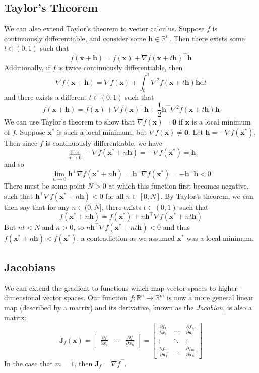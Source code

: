 \documentclass{article}
\begin{document}
\subsection{Taylor's Theorem}
We can also extend Taylor's theorem to vector calculus. Suppose $f$ is continuously differentiable, and consider some $\mathbf{h} \in \mathbb{R}^n$. Then there exists some $t \in (0, 1)$ such that $$f(\mathbf{x + h}) = f(\mathbf{x}) + \nabla f(\mathbf{x} + t\mathbf{h})^\top\mathbf{h}$$ Additionally, if $f$ is twice continuously differentiable, then $$\nabla f(\mathbf{x + h}) = \nabla f(\mathbf{x}) + \int_0^1 \nabla^2 f(\mathbf{x} + t\mathbf{h})\mathbf{h} \text{d}t$$ and there exists a different $t \in (0, 1)$ such that $$f(\mathbf{x + h}) = f(\mathbf{x}) + \nabla f(\mathbf{x})^\top\mathbf{h} + \frac{1}{2}\mathbf{h}^\top\nabla^2 f(\mathbf{x} + t\mathbf{h})\mathbf{h}$$
We can use Taylor's theorem to show that $\nabla f(\mathbf{x}) = \mathbf{0}$ if $\mathbf{x}$ is a local minimum of $f$. Suppose $\mathbf{x^*}$ is such a local minimum, but $\nabla f(\mathbf{x}) \neq \mathbf{0}$. Let $\mathbf{h} = -\nabla f(\mathbf{x^*})$. Then since $f$ is continuously differentiable, we have $$\lim_{n \rightarrow 0} -\nabla f(\mathbf{x^*} + n\mathbf{h}) = -\nabla f(\mathbf{x^*}) = \mathbf{h}$$ and so $$\lim_{n \rightarrow 0}\mathbf{h}^\top \nabla f(\mathbf{x^*} + n\mathbf{h}) = \mathbf{h}^\top\nabla f(\mathbf{x^*}) = -\mathbf{h^\top h} < 0$$ There must be some point $N > 0$ at which this function first becomes negative, such that $\mathbf{h}^\top \nabla f(\mathbf{x^*} + n\mathbf{h}) < 0$ for all $n \in [0, N]$. By Taylor's theorem, we can then say that for any $n \in (0, N]$, there exists $t \in (0, 1)$ such that $$f(\mathbf{x^*} + n\mathbf{h}) = f(\mathbf{x^*}) + n\mathbf{h}^\top\nabla f(\mathbf{x^*} + nt\mathbf{h})$$ But $nt < N$ and $n > 0$, so $n\mathbf{h}^\top\nabla f(\mathbf{x^*} + nt\mathbf{h}) < 0$ and thus $f(\mathbf{x^*} + n\mathbf{h}) < f(\mathbf{x^*})$, a contradiction as we assumed $\mathbf{x^*}$ was a local minimum.

\subsection{Jacobians}
We can extend the gradient to functions which map vector spaces to higher-dimensional vector spaces. Our function $f: \mathbb{R}^n \rightarrow \mathbb{R}^m$ is now a more general linear map (described by a matrix) and its derivative, known as the \textit{Jacobian}, is also a matrix: $$\mathbf{J}_f(\mathbf{x}) = \begin{bmatrix} \frac{\partial f}{\partial x_1} & \hdots & \frac{\partial f}{\partial x_n} \end{bmatrix} = \begin{bmatrix} \frac{\partial f_1}{\partial x_1} & \hdots & \frac{\partial f_1}{\partial \mathbf{x}_n} \\ \vdots & \ddots & \vdots \\ \frac{\partial f_m}{\partial \mathbf{x}_1} & \hdots & \frac{\partial f_m}{\partial \mathbf{x}_n} \end{bmatrix}$$ In the case that $m = 1$, then $\mathbf{J}_f = \nabla f^{\top}$.
\end{document}
